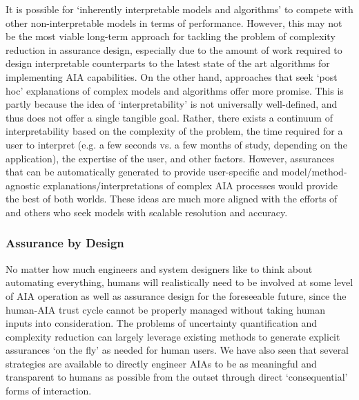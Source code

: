     It is possible for `inherently interpretable models and algorithms' to compete with other non-interpretable models in terms of performance. 
    However, this may not be the most viable long-term approach for tackling the problem of complexity reduction in assurance design, especially due to the amount of work required to design interpretable counterparts to the latest state of the art algorithms for implementing AIA capabilities. 
    On the other hand, approaches that seek `post hoc' explanations of complex models and algorithms offer more promise. 
    This is partly because the idea of `interpretability' is not universally well-defined, and thus does not offer a single tangible goal. Rather, there exists a continuum of interpretability based on the complexity of the problem, the time required for a user to interpret (e.g. a few seconds vs. a few months of study, depending on the application), the expertise of the user, and other factors. However, assurances that can be automatically generated to provide user-specific and model/method-agnostic explanations/interpretations of complex AIA processes would provide the best of both worlds. These ideas are much more aligned with the efforts of \cite{Ruping2006-xj} and others who seek models with scalable resolution and accuracy.

\subsubsection{Assurance by Design}
    No matter how much engineers and system designers like to think about automating everything, humans will realistically need to be involved at some level of AIA operation as well as assurance design for the foreseeable future, since the human-AIA trust cycle cannot be properly managed without taking human inputs into consideration. 
    The problems of uncertainty quantification and complexity reduction can largely leverage existing methods to generate explicit assurances `on the fly' as needed for human users. 
    We have also seen that several strategies are available to directly engineer AIAs to be as meaningful and transparent to humans as possible from the outset through direct `consequential' forms of interaction. 

